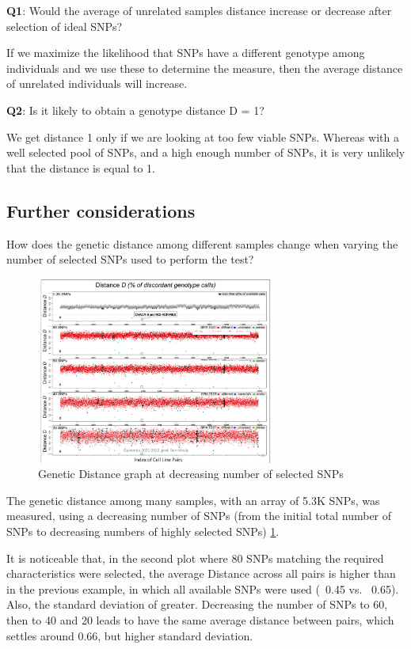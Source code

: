 \textbf{Q1}: Would the average of unrelated samples distance increase or decrease after selection of ideal SNPs?

If we maximize the likelihood that SNPs have a different genotype among individuals and we use these to determine the measure, then the average distance of unrelated individuals will increase.

\textbf{Q2}: Is it likely to obtain a genotype distance D = 1?

We get distance 1 only if we are looking at too few viable SNPs. Whereas with a well selected pool of SNPs, and a high enough number of SNPs, it is very unlikely that the distance is equal to 1.

\subsection{Further considerations}
How does the genetic distance among different samples change when varying the number of selected SNPs used to perform the test?

\begin{figure}[H]
	\centering
	\includegraphics[width=0.7\textwidth]{selected.PNG}
	\caption{Genetic Distance graph at decreasing number of selected SNPs}
	\label{fig:sel_snp}
\end{figure}

The genetic distance among many samples, with an array of 5.3K SNPs, was measured, using a decreasing number of SNPs (from the initial total number of SNPs to decreasing numbers of highly selected SNPs) \ref{fig:sel_snp}.

It is noticeable that, in the second plot where 80 SNPs matching the required characteristics were selected, the average Distance across all pairs is higher than in the previous example, in which all available SNPs were used (~0.45 vs. ~0.65). Also, the standard deviation of greater.
Decreasing the number of SNPs to 60, then to 40 and 20 leads to have the same average distance between pairs, which settles around 0.66, but higher standard deviation.

